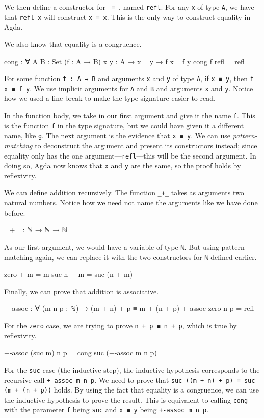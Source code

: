 We then define a constructor for \texttt{\_≡\_}, named \texttt{refl}. For any \texttt{x} of type
\texttt{A}, we have that \texttt{refl x} will construct \texttt{x ≡ x}. This is the only way to
construct equality in Agda.

We also know that equality is a congruence.
\begin{code}
  cong : ∀ {A B : Set} (f : A → B) {x y : A}
    → x ≡ y
    → f x ≡ f y
  cong f refl = refl
\end{code}
For some function \texttt{f : A → B} and arguments \texttt{x} and \texttt{y} of type \texttt{A}, if
\texttt{x ≡ y}, then \texttt{f x ≡ f y}. We use implicit arguments for \texttt{A} and \texttt{B} and
arguments \texttt{x} and \texttt{y}. Notice how we used a line break to make the type signature
easier to read.

In the function body, we take in our first argument and give it the name \texttt{f}. This is the
function \texttt{f} in the type signature, but we could have given it a different name, like
\texttt{g}. The next argument is the evidence that \texttt{x ≡ y}. We can use
\textit{pattern-matching} to deconstruct the argument and present its constructors instead; since
equality only has the one argument---\texttt{refl}---this will be the second argument. In doing so,
Agda now knows that \texttt{x} and \texttt{y} are the same, so the proof holds by reflexivity.

We can define addition recursively. The function \texttt{\_+\_} takes as arguments two natural
numbers. Notice how we need not name the arguments like we have done before.
\begin{code}
  _+_ : ℕ → ℕ → ℕ
\end{code}

As our first argument, we would have a variable of type \texttt{ℕ}. But using pattern-matching
again, we can replace it with the two constructors for \texttt{ℕ} defined earlier.
\begin{code}
  zero  + m = m
  suc n + m = suc (n + m)
\end{code}

Finally, we can prove that addition is associative.
\begin{code}
  +-assoc : ∀ (m n p : ℕ) → (m + n) + p ≡ m + (n + p)
  +-assoc zero    n p = refl
\end{code}
For the \texttt{zero} case, we are trying to prove \texttt{n + p ≡ n + p}, which is true by
reflexivity.
\begin{code}
  +-assoc (suc m) n p = cong suc (+-assoc m n p)
\end{code}
For the \texttt{suc} case (the inductive step), the inductive hypothesis corresponds to the
recursive call \texttt{+-assoc m n p}. We need to prove that \texttt{suc ((m + n) + p) ≡ suc (m + (n
+ p))} holds. By using the fact that equality is a congruence, we can use the inductive hypothesis
to prove the result. This is equivalent to calling \texttt{cong} with the parameter \texttt{f} being
\texttt{suc} and \texttt{x ≡ y} being \texttt{+-assoc m n p}.

